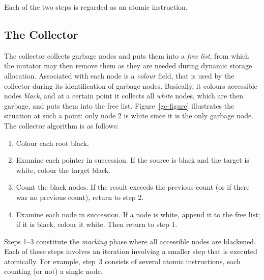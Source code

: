 \noindent Each of the two steps is regarded as an atomic instruction.


\subsection{The Collector}

The collector collects  garbage nodes and  puts
them into  a {\em free list}, from  which the  mutator may then remove
them as they are needed during dynamic storage allocation.  Associated
with each node is a {\em colour} field, that is used  by the collector
during  its  identification of garbage  nodes.  Basically,  it colours
accessible nodes {\em  black}, and at  a certain point it collects all
{\em white} nodes, which are then garbage, and puts them into the free
list. Figure~\ref{gc-figure} illustrates the situation at such a  point:
only node  2 is white since  it is the only garbage node.  The collector
algorithm is as follows:
%
\label{the-collector-informal}
\begin{enumerate}

\item Colour each root black.

\item Examine each pointer in succession. If the source is black and the
      target is white, colour the target black.

\item Count the black nodes. If the result exceeds the previous count (or
      if there was no previous count), return to step 2.

\item Examine each node in succession. If a node is white, append it to
      the free list; if it is black, colour it white. Then return to step 1.

\end{enumerate}

\noindent
Steps 1--3 constitute the {\em marking}  phase where 
all accessible   nodes are blackened.  Each of these steps involves an
iteration involving a smaller step that is executed atomically.  
For example,  step~3
consists   of several atomic instructions,  each  counting (or not) a
single node.


